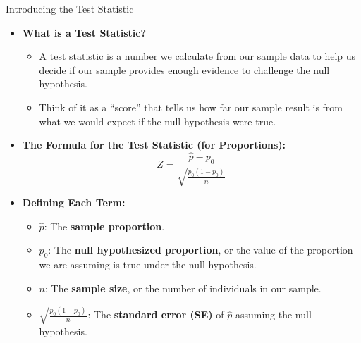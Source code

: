 \documentclass[handout]{beamer} %
\begin{document}
\begin{frame}{Introducing the Test Statistic}
    \begin{itemize}
        \item \textbf{What is a Test Statistic?}
        \begin{itemize}
            \item A test statistic is a number we calculate from our sample data to help us decide if our sample provides enough evidence to challenge the null hypothesis.
            \item Think of it as a “score” that tells us how far our sample result is from what we would expect if the null hypothesis were true.
        \end{itemize}

        \item \textbf{The Formula for the Test Statistic (for Proportions):}
\[
        Z = \frac{\hat{p} - p_0}{\sqrt{\frac{p_0(1 - p_0)}{n}}}
\]

        \item \textbf{Defining Each Term:}
        \begin{itemize}
            \item $\hat{p}$: The \textbf{sample proportion}.
            \item $p_0$: The \textbf{null hypothesized proportion}, or the value of the proportion we are assuming is true under the null hypothesis.
            \item $n$: The \textbf{sample size}, or the number of individuals in our sample.
            \item $\sqrt{\frac{p_0(1 - p_0)}{n}} $: The \textbf{standard error (SE)} of $\hat{p}$ assuming the null hypothesis.
        \end{itemize}
    \end{itemize}
\end{frame}
\end{document}
